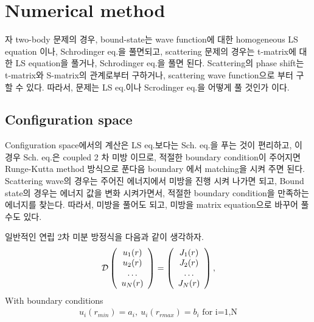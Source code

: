 \documentclass[10pt]{book}
\newcommand{\bea}{\begin{eqnarray}}
\newcommand{\eea}{\end{eqnarray}}
\begin{document}
\section{Numerical method}
자 two-body 문제의 경우, bound-state는 wave function에 대한 
homogeneous LS equation 이나, Schrodinger eq.을 풀면되고,
scattering 문제의 경우는 t-matrix에 대한 LS equation을 풀거나,
Schrodinger eq.을 풀면 된다. Scattering의 phase shift는 
t-matrix와 S-matrix의 관계로부터 구하거나, scattering wave function으로 부터 구할 수 있다.
따라서, 문제는 LS eq.이나 Scrodinger eq.을 어떻게 풀 것인가 이다.

\subsection{Configuration space}
Configuration space에서의 계산은 LS eq.보다는 Sch. eq.을 푸는 것이 편리하고,
이 경우 Sch. eq.은 coupled 2 차 미방 이므로, 
적절한 boundary condition이 주어지면 
Runge-Kutta method 방식으로 푼다음 boundary 에서 matching을 시켜 주면 된다.
Scattering wave의 경우는 주어진 에너지에서 미방을 진행 시켜 나가면 되고,
Bound state의 경우는 에너지 값을 변화 시켜가면서, 적절한 boundary condition을 만족하는 
에너지를 찾는다.  
따라서, 미방을 풀어도 되고, 미방을 matrix equation으로 바꾸어 풀 수도 있다. 

일반적인 연립 2차 미분 방정식을 다음과 같이 생각하자. 
\bea 
{\cal D}\left(\begin{array}{c} u_1(r) \\ u_2(r) \\ \dots \\ u_N(r) \end{array}  \right)
 =\left(\begin{array}{c} J_1(r) \\ J_2(r) \\ \dots \\ J_N(r) \end{array}  \right),
\eea 
With boundary conditions
\bea 
u_i(r_{min})=a_i,\  u_i(r_{rmax})=b_i\mbox{ for i=1,N}
\eea 
\end{document}
